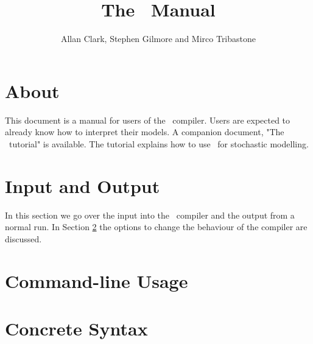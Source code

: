 \documentclass[10pt,a4paper]{article}
\title{The \srmc\ Manual}
\author{
Allan Clark, Stephen Gilmore and Mirco Tribastone
}
\begin{document}
\maketitle



\section*{About \smc}

This document is a manual for users of the \srmc\ compiler.
Users are expected to already know how to interpret their models.
A companion document, "The \srmc\ tutorial" is available.
The tutorial explains how to use \srmc\ for stochastic modelling.

\section{Input and Output}
In this section we go over the input into the \srmc\ compiler and the
output from a normal run. In Section \ref{section:command-line-options}
the options to change the behaviour of the compiler are discussed.


\section{Command-line Usage}
\label{section:command-line-options}


\section{Concrete Syntax}

\end{document}
